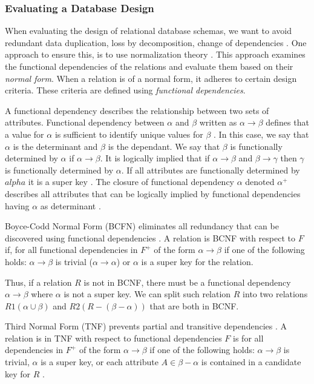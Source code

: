 \subsubsection*{Evaluating a Database Design}
When evaluating the design of relational database schemas, we want to avoid redundant data duplication, loss by decomposition, change of dependencies \cite{DBSBook}.
One approach to ensure this, is to use normalization theory \cite{DBSBook}. This approach examines the functional dependencies of the relations and evaluate them based on their \textit{normal form}.
When a relation is of a normal form, it adheres to certain design criteria. These criteria are defined using \textit{functional dependencies}.

A functional dependency describes the relationship between two sets of attributes. 
Functional dependency between $\alpha$ and $\beta$ written as $\alpha \rightarrow \beta$ defines that a value for $\alpha$ is sufficient to identify unique values for $\beta$ \cite{DBSBook}.
In this case, we say that $\alpha$ is the determinant and $\beta$ is the dependant. 
We say that $\beta$ is functionally determined by $\alpha$ if $\alpha \rightarrow \beta$.
It is logically implied that if $\alpha \rightarrow \beta$ and $\beta \rightarrow \gamma$ then $\gamma$ is functionally determined by $\alpha$.
If all attributes are functionally determined by $alpha$ it is a super key \cite{DBSBook}.
The closure of functional dependency $\alpha$ denoted $\alpha^+$ describes all attributes that can be logically implied by functional dependencies having $\alpha$ as determinant \cite{DBSBook}. 

Boyce-Codd Normal Form (BCFN) eliminates all redundancy that can be discovered using functional dependencies \cite{DBSBook}. 
A relation is BCNF with respect to $F$ if, for all functional dependencies in $F^+$ of the form $\alpha \rightarrow \beta$ if one of the following holds:
$\alpha \rightarrow \beta$ is trivial ($\alpha \rightarrow \alpha$) or $\alpha$ is a super key for the relation.

Thus, if a relation $R$ is not in BCNF, there must be a functional dependency $\alpha \rightarrow \beta$ where $\alpha$ is not a super key. 
We can split such relation $R$ into two relations $R1(\alpha \cup \beta)$ and $R2(R-(\beta-\alpha))$ that are both in BCNF.

Third Normal Form (TNF) prevents partial and transitive dependencies \cite{MontayaNormalForms}.
A relation is in TNF with respect to functional dependencies $F$ is for all dependencies in $F^+$ of the form $\alpha \rightarrow \beta$ if one of the following holds: 
$\alpha \rightarrow \beta$ is trivial, $\alpha$ is a super key, or each attribute $A \in \beta-\alpha$ is contained in a candidate key for $R$ \cite{DBSBook}.

